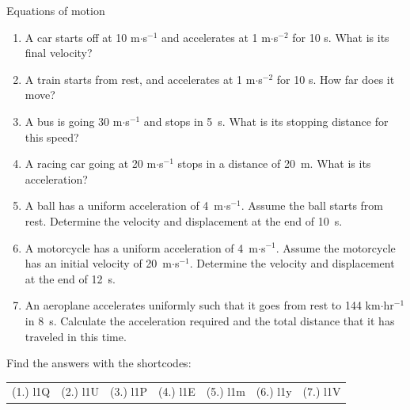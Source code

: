 \begin{exercises}{Equations of motion}
            \nopagebreak \noindent
          \label{m38796*id79517}\begin{enumerate}[noitemsep, label=\textbf{\arabic*}. ] 
\label{m38796*uid144}\item A car starts off at 10 m$\ensuremath{\cdot}$s${}^{-1}$ and accelerates at 1 m$\ensuremath{\cdot}$s${}^{-2}$ for 10 s. What is its final velocity?\newline
\label{m38796*uid145}\item A train starts from rest, and accelerates at 1 m$\ensuremath{\cdot}$s${}^{-2}$ for 10 s. How far does it move?\newline
\label{m38796*uid146}\item A bus is going 30 m$\ensuremath{\cdot}$s${}^{-1}$ and stops in 5~s. What is its stopping distance for this speed?\newline
\label{m38796*uid147}\item A racing car going at 20 m$\ensuremath{\cdot}$s${}^{-1}$ stops in a distance of 20~m. What is its acceleration?\newline
\label{m38796*uid148}\item A ball has a uniform acceleration of 4~m$\ensuremath{\cdot}$s${}^{-1}$. Assume the ball starts from rest. Determine the velocity and displacement at the end of 10~s.\newline
\label{m38796*uid149}\item A motorcycle has a uniform acceleration of 4~m$\ensuremath{\cdot}$s${}^{-1}$. Assume the motorcycle has an initial velocity of 20~m$\ensuremath{\cdot}$s${}^{-1}$. Determine the velocity and displacement at the end of 12~s.\newline
\label{m38796*uid150}\item An aeroplane accelerates uniformly such that it goes from rest to 144 km$\ensuremath{\cdot}$hr${}^{-1}$in 8~s. Calculate the acceleration required and the total distance that it has traveled in this time.\newline
\end{enumerate}
    \label{m38796*cid11}
\par {} Find the answers with the shortcodes:
 \par \begin{tabular}[h]{cccccc}
 (1.) l1Q  &  (2.) l1U  &  (3.) l1P  &  (4.) l1E  &  (5.) l1m  &  (6.) l1y  & (7.) l1V \end{tabular}
\end{exercises}

